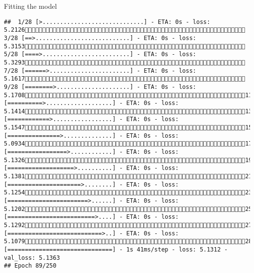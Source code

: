 \documentclass[
  ignorenonframetext,
]{beamer}
\begin{document}
\begin{frame}[fragile]{Fitting the model}
\begin{verbatim}
##  1/28 [>.............................] - ETA: 0s - loss: 5.2126 3/28 [==>...........................] - ETA: 0s - loss: 5.3153 5/28 [====>.........................] - ETA: 0s - loss: 5.3293 7/28 [======>.......................] - ETA: 0s - loss: 5.1617 9/28 [========>.....................] - ETA: 0s - loss: 5.170811/28 [==========>...................] - ETA: 0s - loss: 5.141413/28 [============>.................] - ETA: 0s - loss: 5.154715/28 [===============>..............] - ETA: 0s - loss: 5.093417/28 [=================>............] - ETA: 0s - loss: 5.132619/28 [===================>..........] - ETA: 0s - loss: 5.138121/28 [=====================>........] - ETA: 0s - loss: 5.125423/28 [=======================>......] - ETA: 0s - loss: 5.120225/28 [=========================>....] - ETA: 0s - loss: 5.129227/28 [===========================>..] - ETA: 0s - loss: 5.107928/28 [==============================] - 1s 41ms/step - loss: 5.1312 - val_loss: 5.1363
## Epoch 89/250

\end{verbatim}
\end{frame}
\end{document}
